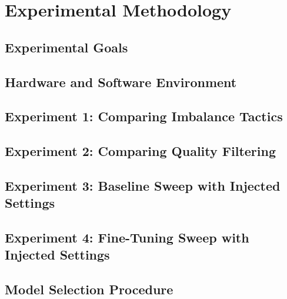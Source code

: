 \chapter{Experimental Methodology}

\section{Experimental Goals}

\section{Hardware and Software Environment}

\section{Experiment 1: Comparing Imbalance Tactics}

\section{Experiment 2: Comparing Quality Filtering}

\section{Experiment 3: Baseline Sweep with Injected Settings}

\section{Experiment 4: Fine-Tuning Sweep with Injected Settings}

\section{Model Selection Procedure}
